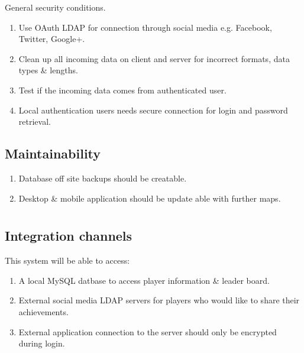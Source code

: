 \documentclass[letterpaper]{article}
\begin{document}
			General security conditions.
			\begin{enumerate}
				\item Use OAuth LDAP for connection through social media e.g. Facebook, Twitter, Google+.
				\item Clean up all incoming data on client and server for incorrect formats, data types \& lengths.
				\item Test if the incoming data comes from authenticated user.
				\item Local authentication users needs secure connection for login and password retrieval.
			\end{enumerate}
			
			\subsection*{Maintainability}
			\vspace{0.1in}
			
			\begin{enumerate}
				\item Database off site backups should be creatable.
				\item Desktop \& mobile application should be update able with further maps.
			\end{enumerate}
			
			\vspace{0.2in}
			\section*{\colorbox{black}{}} 
			\vspace{0.1in}
			
			\subsection*{Integration channels}
			\vspace{0.1in}
			
			This system will be able to access:
			\begin{enumerate}
				\item A local MySQL datbase to access player information \& leader board.
				\item External social media LDAP servers for players who would like to share their achievements.
				\item External application connection to the server should only be encrypted during login.
			\end{enumerate}
		
\end{document}
